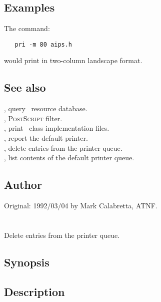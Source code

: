 \subsection*{Examples}

The command:

\begin{verbatim}
   pri -m 80 aips.h
\end{verbatim}

\noindent
would print  in two-column landscape format.

\subsection*{See also}

, query \aipspp\ resource database.\\
, \textsc{PostScript} filter.\\
, print \aipspp\ class implementation files.\\
, report the default printer.\\
, delete entries from the printer queue.\\
, list contents of the default printer queue.

\subsection*{Author}

Original: 1992/03/04 by Mark Calabretta, ATNF.


\newpage
\section{}
\label{prm}

Delete entries from the printer queue.

\subsection*{Synopsis}

\begin{synopsis}
\end{synopsis}

\subsection*{Description}

